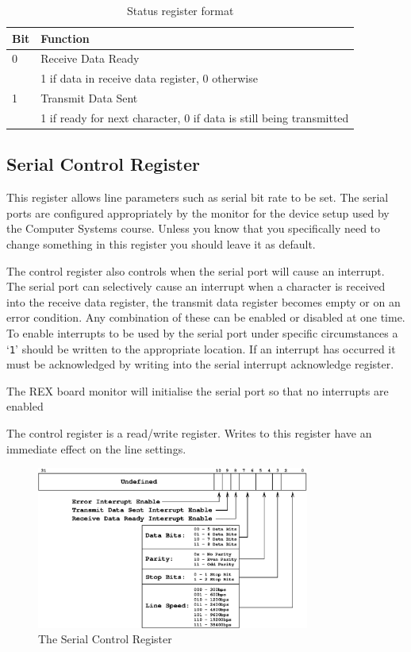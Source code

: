 \documentclass[a4paper,10pt]{article}
\begin{document}
\begin{table}[h]
\begin{center}
\begin{tabular}{|l|l|}
\hline
\textbf{Bit} & \textbf{Function} \\
\hline
0 & Receive Data Ready \\
 & 1 if data in receive data register, 0 otherwise \\
\hline
1 & Transmit Data Sent \\
 & 1 if ready for next character, 0 if data is still being transmitted  \\
\hline
\end{tabular}
\end{center}
\caption{Status register format}
\label{table:serialstat}
\end{table}

\subsection{Serial Control Register}

This register allows line parameters such as serial bit rate to be
set. The serial ports are configured appropriately by the monitor for
the device setup used by the Computer Systems course. Unless you know
that you specifically need to change something in this register you
should leave it as default.

The control register also controls when the serial port will cause an
interrupt. The serial port can selectively cause an interrupt when a
character is received into the receive data register, the transmit
data register becomes empty or on an error condition. Any combination of
these can be enabled or disabled at one time. To enable interrupts to
be used by the serial port under specific circumstances a `\texttt{1}'
should be written to the appropriate location. If an interrupt has
occurred it must be acknowledged by writing into the serial interrupt
acknowledge register.

The REX board monitor will initialise the serial port so that no
interrupts are enabled

The control register is a read/write register. Writes to this register
have an immediate effect on the line settings.

\begin{figure}[h]
\begin{center}
\includegraphics[width=0.8\textwidth]{serial_cr.eps}
\caption{The Serial Control Register}
\label{serial_cr_pic}
\end{center}
\end{figure}
\end{document}
